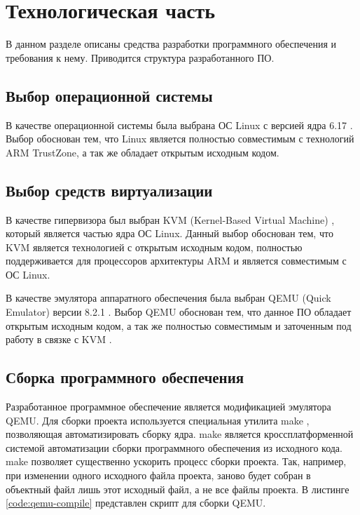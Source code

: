 \section{Технологическая часть}

В данном разделе описаны средства разработки программного обеспечения и требования к нему. Приводится структура разрабо­танного ПО.

\subsection{Выбор операционной системы}

В качестве операционной системы была выбрана ОС Linux с версией ядра 6.17 \cite{linux}. Выбор обоснован тем, что Linux является полностью совместимым с технологий ARM TrustZone, а так же обладает открытым исходным кодом.

\subsection{Выбор средств виртуализации}

В качестве гипервизора был выбран KVM (Kernel-Based Virtual Machine) \cite{kvm}, который является частью ядра ОС Linux. Данный выбор обоснован тем, что KVM является технологией с открытым исходным кодом, полностью поддерживается для процессоров архитектуры ARM и является совместимым с ОС Linux.

В качестве эмулятора аппаратного обеспечения была выбран QEMU (Quick Emulator) версии 8.2.1 \cite{qemu}. Выбор QEMU обоснован тем, что данное ПО обладает открытым исходным кодом, а так же полностью совместимым и заточенным под работу в связке с KVM \cite{kvm}.

\subsection{Сборка программного обеспечения}

Разработанное программное обеспечение является модификацией эмулятора QEMU. Для сборки проекта используется специальная утилита make \cite{make}, позволяющая автоматизировать сборку ядра. make является кроссплатформенной системой автоматизации сборки программного обеспечения из исходного кода. make позволяет существенно ускорить процесс сборки проекта. Так, например, при изменении одного исходного файла проекта, заново будет собран в объектный файл лишь этот исходный файл, а не все файлы проекта. В листинге \ref{code:qemu-compile} представлен скрипт для сборки QEMU.

